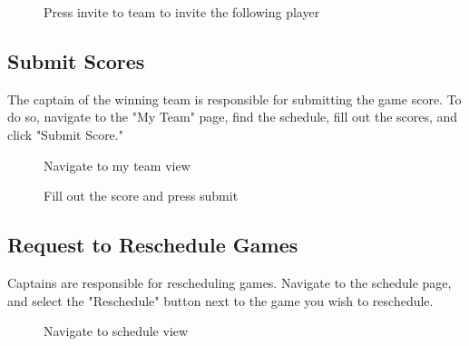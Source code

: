 \documentclass{article}
\begin{document}
\begin{figure}[H]
    \centering
    \caption{Press invite to team to invite the following player}
\end{figure}

\subsection{Submit Scores}
The captain of the winning team is responsible for submitting the game score. To do so, navigate to the "My Team" page, find the schedule, fill out the scores, and click "Submit Score."

\begin{figure}[H]
    \centering
    \caption{Navigate to my team view}
\end{figure}

\begin{figure}[H]
    \centering
    \caption{Fill out the score and press submit}
\end{figure}

\subsection{Request to Reschedule Games}
Captains are responsible for rescheduling games. Navigate to the schedule page, and select the "Reschedule" button next to the game you wish to reschedule.

\begin{figure}[H]
    \centering
    \caption{Navigate to schedule view}
\end{figure}
\end{document}
